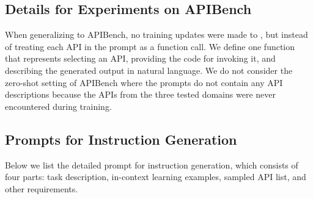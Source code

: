 

\subsection{Details for Experiments on APIBench}

When generalizing \ourmodel to APIBench, no training updates were made to \ourmodel, but instead of treating each API in the prompt as a function call. We define one function that represents selecting an API, providing the code for invoking it, and describing the generated output in natural language. We do not consider the zero-shot setting of APIBench where the prompts do not contain any API descriptions because the APIs from the three tested domains were never encountered during training.

\subsection{Prompts for Instruction Generation}
\label{sec:inst_prompt}
Below we list the detailed prompt for instruction generation, which consists of four parts: task description, in-context learning examples, sampled API list, and other requirements.

